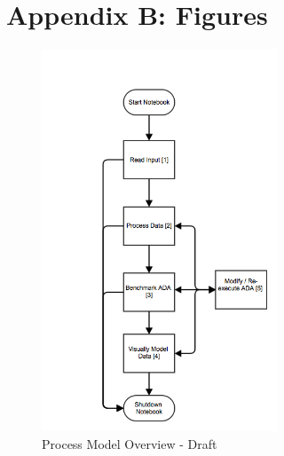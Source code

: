\documentclass[twoside]{article}
\begin{document}

\section{Appendix B: Figures}

\begin{figure}[h]
    \centering
    \includegraphics[width=7cm]{"images/process_model_overview"}
    \caption{Process Model Overview - Draft}
    \label{fig:process_model_overview_draft}
\end{figure}
\end{document}

